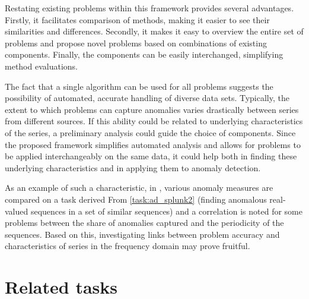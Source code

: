 Restating existing problems within this framework provides several advantages. Firstly, it facilitates comparison of methods, making it easier to see their similarities and differences. Secondly, it makes it easy to overview the entire set of problems and propose novel problems based on combinations of existing components. Finally, the components can be easily interchanged, simplifying method evaluations.

The fact that a single algorithm can be used for all problems suggests the possibility of automated, accurate handling of diverse data sets. Typically, the extent to which problems can capture anomalies varies drastically between series from different sources. If this ability could be related to underlying characteristics of the series, a preliminary analysis could guide the choice of components. Since the proposed framework simplifies automated analysis and allows for problems to be applied interchangeably on the same data, it could help both in finding these underlying characteristics and in applying them to anomaly detection.

As an example of such a characteristic, in \cite{chandola3}, various anomaly measures are compared on a task derived From \ref{task:ad_splunk2} (finding anomalous real-valued sequences in a set of similar sequences) and a correlation is noted for some problems between the share of anomalies captured and the periodicity of the sequences. Based on this, investigating links between problem accuracy and characteristics of series in the frequency domain may prove fruitful.

\section{Related tasks}
\label{sect:related_tasks_framework}

